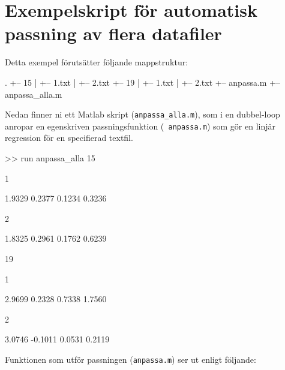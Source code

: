 \section{Exempelskript för automatisk passning av flera datafiler}
\label{sec:matlab-loop-read-fit}
Detta exempel förutsätter följande mappstruktur:

\begin{terminaloutput}
.
+-- 15
|   +-- 1.txt
|   +-- 2.txt
+-- 19
|   +-- 1.txt
|   +-- 2.txt
+-- anpassa.m
+-- anpassa_alla.m
\end{terminaloutput}

Nedan finner ni ett Matlab skript ({\tt anpassa\_alla.m}), som
i en dubbel-loop anropar en egenskriven passningsfunktion ({\tt
  anpassa.m}) som gör en linjär regression för en specifierad textfil. 


\begin{terminaloutput}
>> run anpassa_alla
    15

     1

    1.9329    0.2377    0.1234    0.3236

     2

    1.8325    0.2961    0.1762    0.6239

    19

     1

    2.9699    0.2328    0.7338    1.7560

     2

    3.0746   -0.1011    0.0531    0.2119
\end{terminaloutput}

Funktionen som utför passningen ({\tt anpassa.m}) ser ut enligt följande:


